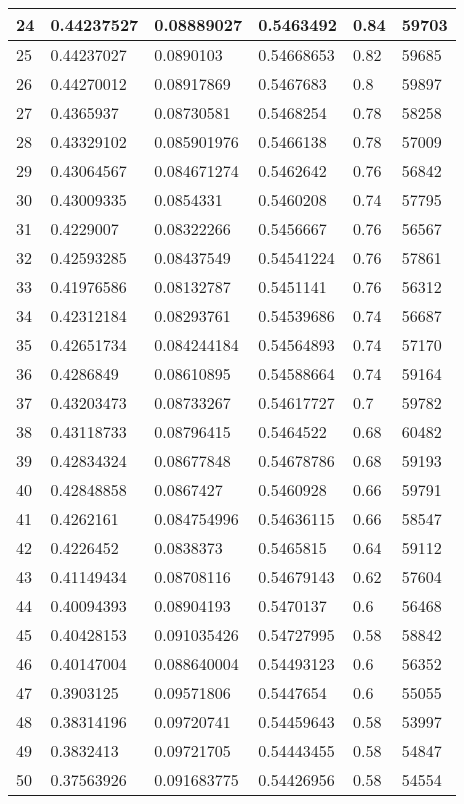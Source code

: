 \begin{longtable}{|l|l|l|l|l|l|}
24 & 0.44237527 & 0.08889027 & 0.5463492 & 0.84 & 59703 \\ \hline 
25 & 0.44237027 & 0.0890103 & 0.54668653 & 0.82 & 59685 \\ \hline 
26 & 0.44270012 & 0.08917869 & 0.5467683 & 0.8 & 59897 \\ \hline 
27 & 0.4365937 & 0.08730581 & 0.5468254 & 0.78 & 58258 \\ \hline 
28 & 0.43329102 & 0.085901976 & 0.5466138 & 0.78 & 57009 \\ \hline 
29 & 0.43064567 & 0.084671274 & 0.5462642 & 0.76 & 56842 \\ \hline 
30 & 0.43009335 & 0.0854331 & 0.5460208 & 0.74 & 57795 \\ \hline 
31 & 0.4229007 & 0.08322266 & 0.5456667 & 0.76 & 56567 \\ \hline 
32 & 0.42593285 & 0.08437549 & 0.54541224 & 0.76 & 57861 \\ \hline 
33 & 0.41976586 & 0.08132787 & 0.5451141 & 0.76 & 56312 \\ \hline 
34 & 0.42312184 & 0.08293761 & 0.54539686 & 0.74 & 56687 \\ \hline 
35 & 0.42651734 & 0.084244184 & 0.54564893 & 0.74 & 57170 \\ \hline 
36 & 0.4286849 & 0.08610895 & 0.54588664 & 0.74 & 59164 \\ \hline 
37 & 0.43203473 & 0.08733267 & 0.54617727 & 0.7 & 59782 \\ \hline 
38 & 0.43118733 & 0.08796415 & 0.5464522 & 0.68 & 60482 \\ \hline 
39 & 0.42834324 & 0.08677848 & 0.54678786 & 0.68 & 59193 \\ \hline 
40 & 0.42848858 & 0.0867427 & 0.5460928 & 0.66 & 59791 \\ \hline 
41 & 0.4262161 & 0.084754996 & 0.54636115 & 0.66 & 58547 \\ \hline 
42 & 0.4226452 & 0.0838373 & 0.5465815 & 0.64 & 59112 \\ \hline 
43 & 0.41149434 & 0.08708116 & 0.54679143 & 0.62 & 57604 \\ \hline 
44 & 0.40094393 & 0.08904193 & 0.5470137 & 0.6 & 56468 \\ \hline 
45 & 0.40428153 & 0.091035426 & 0.54727995 & 0.58 & 58842 \\ \hline 
46 & 0.40147004 & 0.088640004 & 0.54493123 & 0.6 & 56352 \\ \hline 
47 & 0.3903125 & 0.09571806 & 0.5447654 & 0.6 & 55055 \\ \hline 
48 & 0.38314196 & 0.09720741 & 0.54459643 & 0.58 & 53997 \\ \hline 
49 & 0.3832413 & 0.09721705 & 0.54443455 & 0.58 & 54847 \\ \hline 
50 & 0.37563926 & 0.091683775 & 0.54426956 & 0.58 & 54554 \\ \hline 
\end{longtable}